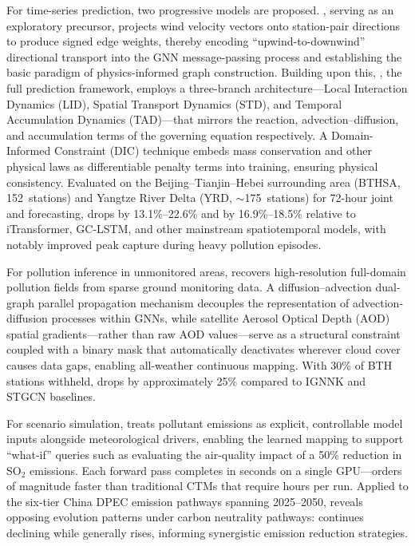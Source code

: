 \begin{abstract*}
For time-series prediction, two progressive models are proposed. \ModelPred{}, serving as an exploratory precursor, projects wind velocity vectors onto station-pair directions to produce signed edge weights, thereby encoding ``upwind-to-downwind'' directional transport into the GNN message-passing process and establishing the basic paradigm of physics-informed graph construction. Building upon this, \ModelSurr{}, the full prediction framework, employs a three-branch architecture---Local Interaction Dynamics (LID), Spatial Transport Dynamics (STD), and Temporal Accumulation Dynamics (TAD)---that mirrors the reaction, advection--diffusion, and accumulation terms of the governing equation respectively. A Domain-Informed Constraint (DIC) technique embeds mass conservation and other physical laws as differentiable penalty terms into training, ensuring physical consistency. Evaluated on the Beijing--Tianjin--Hebei surrounding area (BTHSA, 152~stations) and Yangtze River Delta (YRD, ${\sim}$175~stations) for 72-hour joint \PM{} and \ozone{} forecasting, \PM{} \RMSE{} drops by 13.1\%--22.6\% and \ozone{} \RMSE{} by 16.9\%--18.5\% relative to iTransformer, GC-LSTM, and other mainstream spatiotemporal models, with notably improved peak capture during heavy pollution episodes.

For pollution inference in unmonitored areas, \ModelInfer{} recovers high-resolution full-domain pollution fields from sparse ground monitoring data. A diffusion--advection dual-graph parallel propagation mechanism decouples the representation of advection-diffusion processes within GNNs, while satellite Aerosol Optical Depth (AOD) spatial gradients---rather than raw AOD values---serve as a structural constraint coupled with a binary mask that automatically deactivates wherever cloud cover causes data gaps, enabling all-weather continuous mapping. With 30\% of BTH stations withheld, \MAE{} drops by approximately 25\% compared to IGNNK and STGCN baselines.

For scenario simulation, \ModelSim{} treats pollutant emissions as explicit, controllable model inputs alongside meteorological drivers, enabling the learned mapping to support ``what-if'' queries such as evaluating the air-quality impact of a 50\% reduction in SO$_2$ emissions. Each forward pass completes in seconds on a single GPU---orders of magnitude faster than traditional CTMs that require hours per run. Applied to the six-tier China DPEC emission pathways spanning 2025--2050, \ModelSim{} reveals opposing evolution patterns under carbon neutrality pathways: \PM{} continues declining while \ozone{} generally rises, informing synergistic emission reduction strategies.


\end{abstract*}
